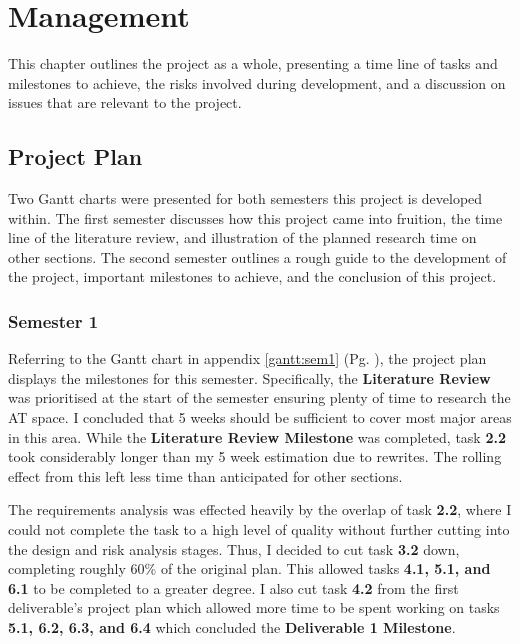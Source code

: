 %
\chapter{Management}
\label{sec:management}

This chapter outlines the project as a whole, presenting a time line of tasks and milestones to achieve, the risks involved during development, and a discussion on issues that are relevant to the project.



\section{Project Plan}
\label{sec:management:pp}

\noindent Two Gantt charts were presented for both semesters this project is developed within. The first semester discusses how this project came into fruition, the time line of the literature review, and illustration of the planned research time on other sections. The second semester outlines a rough guide to the development of the project, important milestones to achieve, and the conclusion of this project.

\subsection{Semester 1}
\label{sec:management:pp:sem1}

\noindent Referring to the Gantt chart in appendix \ref{gantt:sem1} (Pg. \pageref{gantt:sem1}), the project plan displays the milestones for this semester. Specifically, the \textbf{Literature Review} was prioritised at the start of the semester ensuring plenty of time to research the AT space. I concluded that 5 weeks should be sufficient to cover most major areas in this area. While the \textbf{Literature Review Milestone} was completed, task \textbf{2.2} took considerably longer than my 5 week estimation due to rewrites. The rolling effect from this left less time than anticipated for other sections.

The requirements analysis was effected heavily by the overlap of task \textbf{2.2}, where I could not complete the task to a high level of quality without further cutting into the design and risk analysis stages. Thus, I decided to cut task \textbf{3.2} down, completing roughly 60\% of the original plan. This allowed tasks \textbf{4.1, 5.1, and 6.1} to be completed to a greater degree. I also cut task \textbf{4.2} from the first deliverable's project plan which allowed more time to be spent working on tasks \textbf{5.1, 6.2, 6.3, and 6.4} which concluded the \textbf{Deliverable 1 Milestone}. 



